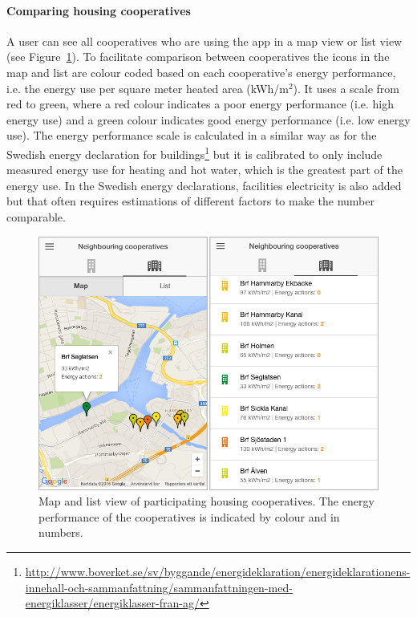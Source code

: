 \paragraph{Comparing housing cooperatives}

A user can see all cooperatives who are using the app in a map view or list view (see Figure~\ref{fig:Figure202_Housing_cooperatives_comparison}). To facilitate comparison between cooperatives the icons in the map and list are colour coded based on each cooperative's energy performance, i.e. the energy use per square meter heated area (kWh/m$^2$). It uses a scale from red to green, where a red colour indicates a poor energy performance (i.e. high energy use) and a green colour indicates good energy performance (i.e. low energy use). The energy performance scale is calculated in a similar way as for the Swedish energy declaration for buildings\footnote{\url{http://www.boverket.se/sv/byggande/energideklaration/energideklarationens-innehall-och-sammanfattning/sammanfattningen-med-energiklasser/energiklasser-fran-ag/}}  but it is calibrated to only include measured energy use for heating and hot water, which is the greatest part of the energy use. In the Swedish energy declarations, facilities electricity is also added but that often requires estimations of different factors to make the number comparable.

\begin{figure}[h!]
	\centering
	\includegraphics[width=0.9\linewidth]{img/Figure202_Housing_cooperatives_comparison.png}
	\caption{Map and list view of participating housing cooperatives. The energy performance of the cooperatives is indicated by colour and in numbers.}
	\label{fig:Figure202_Housing_cooperatives_comparison}
\end{figure}



